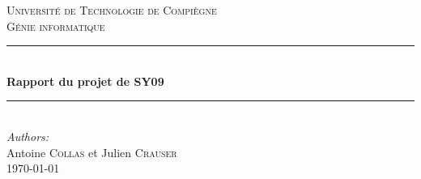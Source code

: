 \documentclass[a4paper,11pt,oneside,roman]{article}
\begin{document}
    
    \begin{titlepage}
    
        \newcommand{\HRule}{\rule{\linewidth}{0.5mm}} %
        
        \center %
         
        
        \textsc{\LARGE Université de Technologie de Compiègne}\\[0.5cm] %
        \textsc{\Large Génie informatique}\\[1.5cm] %
        
        
        \HRule \\[0.4cm]
        { \huge \bfseries Rapport du projet de SY09}\\[0.4cm] %
        \HRule \\[1.5cm]
         
        
        \Large \emph{Authors:}\\
        Antoine \textsc{Collas} et Julien \textsc{Crauser}\\[3cm] %
        
        
        {\large \AdvanceDate[-4]\today}\\[4cm] %
        

\end{titlepage}
\end{document}

